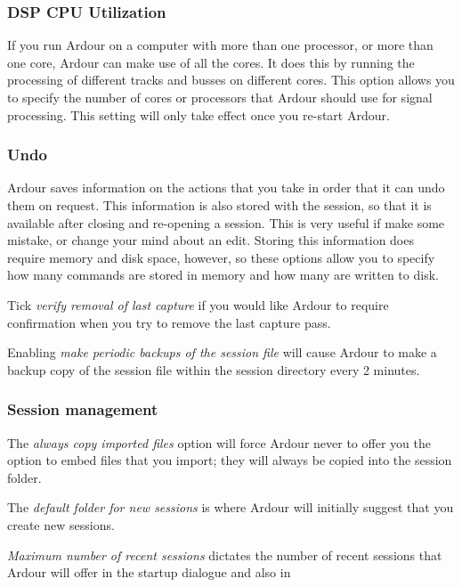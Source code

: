 \documentclass[10pt,a4paper]{book}
\newcommand{\menu}[1]{\emph{\StrSubstitute{#1}{,}{ $\rightarrow$ }}}
\begin{document}
\subsubsection{DSP CPU Utilization}

If you run Ardour on a computer with more than one processor, or more
than one core, Ardour can make use of all the cores.  It does this by
running the processing of different tracks and busses on different
cores.  This option allows you to specify the number of cores or
processors that Ardour should use for signal processing.  This setting
will only take effect once you re-start Ardour.

\subsubsection{Undo}

Ardour saves information on the actions that you take in order that it
can undo them on request.  This information is also stored with the
session, so that it is available after closing and re-opening a
session.  This is very useful if make some mistake, or change your
mind about an edit.  Storing this information does require memory and
disk space, however, so these options allow you to specify how many
commands are stored in memory and how many are written to disk.

Tick \emph{verify removal of last capture} if you would like Ardour to
require confirmation when you try to remove the last capture pass.

Enabling \emph{make periodic backups of the session file} will cause
Ardour to make a backup copy of the session file within the session
directory every 2 minutes.

\subsubsection{Session management}

The \emph{always copy imported files} option will force Ardour never
to offer you the option to embed files that you import; they will
always be copied into the session folder.

The \emph{default folder for new sessions} is where Ardour will
initially suggest that you create new sessions.

\emph{Maximum number of recent sessions} dictates the number of recent
sessions that Ardour will offer in the startup dialogue and also in
\menu{Session,Recent...}
\end{document}
